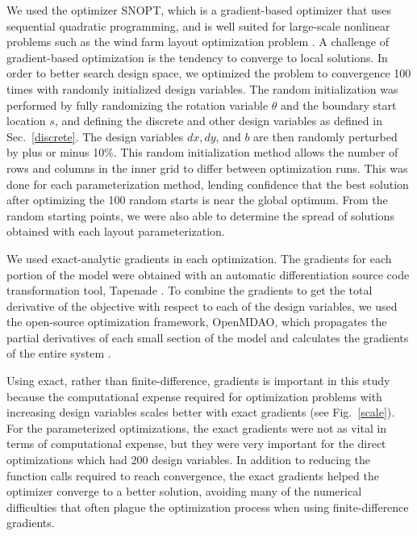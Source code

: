 \documentclass[wes, manuscript]{copernicus}
\begin{document}
We used the optimizer SNOPT, which is a gradient-based optimizer that uses sequential quadratic programming, and is well suited for large-scale nonlinear problems such as the wind farm layout optimization problem \citep{gill2005snopt}. 
A challenge of gradient-based optimization is the tendency to converge to local solutions. In order to better search design space, we optimized the problem to convergence 100 times with randomly initialized design variables. 
%
The random initialization was performed by fully randomizing the rotation variable $\theta$ and the boundary start location $s$, and defining the discrete and other design variables as defined in Sec.~\ref{discrete}. The design variables $dx, dy$, and $b$ are then randomly perturbed by plus or minus 10\%. This random initialization method allows the number of rows and columns in the inner grid to differ between optimization runs.
%
This was done for each parameterization method, lending confidence that the best solution after optimizing the 100 random starts is near the global optimum. 
From the random starting points, we were also able to determine the spread of solutions obtained with each layout parameterization. 

We used exact-analytic gradients in each optimization. The gradients for each portion of the model were obtained with an automatic differentiation source code transformation tool, Tapenade \citep{hascoet2013tapenade}. To combine the gradients to get the total derivative of the objective with respect to each of the design variables, we used the open-source optimization framework, OpenMDAO, which propagates the partial derivatives of each small section of the model and calculates the gradients of the entire system \citep{gray2010openmdao}.

Using exact, rather than finite-difference, gradients is important in this study because the computational expense required for optimization problems with increasing design variables scales better with exact gradients (see Fig.~\ref{scale}). For the parameterized optimizations, the exact gradients were not as vital in terms of computational expense, but they were very important for the direct optimizations which had 200 design variables. In addition to reducing the function calls required to reach convergence, the exact gradients helped the optimizer converge to a better solution, avoiding many of the numerical difficulties that often plague the optimization process when using finite-difference gradients. 
\end{document}
